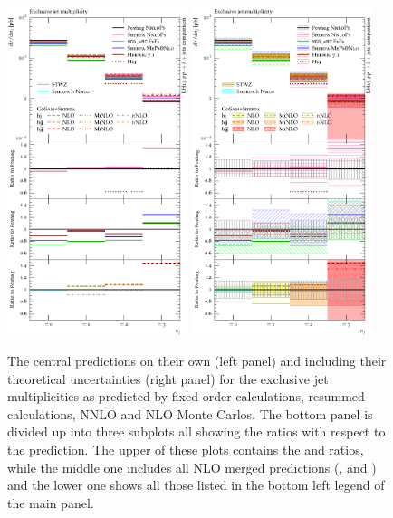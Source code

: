 \begin{figure}[t!]
  \centering
  \includegraphics[width=0.47\textwidth]{figures/hjetscomp_u_NJet_excl_30.pdf}
  \hfill
  \includegraphics[width=0.47\textwidth]{figures/hjetscomp_NJet_excl_30.pdf}
  \caption{\label{fig:hjetscomp:results:inclobs:njets_excl}%
    The central predictions on their own (left panel) and including their
    theoretical uncertainties (right panel) for the exclusive jet multiplicities
    as predicted by fixed-order calculations, resummed calculations,
    NNLO and NLO Monte Carlos. The bottom panel is divided up into
    three subplots all showing the ratios with respect to the \Powheg
    \NNLOPS prediction. The upper of these plots contains the \Hej and
    \Sherpa \NNLOPS ratios, while the middle one includes all NLO
    merged predictions (\MGaMC, \Herwig and \Sherpa) and the lower one
    shows all those listed in the bottom left legend of the main panel.}
\end{figure}

